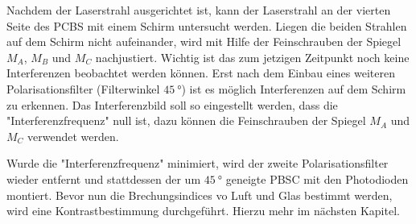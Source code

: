 Nachdem der Laserstrahl ausgerichtet ist, kann der Laserstrahl an der vierten Seite des PCBS
mit einem Schirm untersucht werden.
Liegen die beiden Strahlen auf dem Schirm nicht aufeinander, wird mit Hilfe der
Feinschrauben der Spiegel $M_A$, $M_B$ und $M_C$ nachjustiert. Wichtig ist das zum
jetzigen Zeitpunkt noch keine Interferenzen beobachtet werden können. Erst nach
dem Einbau eines weiteren Polarisationsfilter (Filterwinkel $\SI{45}{\degree}$)
ist es möglich Interferenzen auf dem Schirm zu erkennen.
Das Interferenzbild soll so eingestellt werden, dass die
"Interferenzfrequenz" null ist, dazu können die Feinschrauben der Spiegel
$M_A$ und $M_C$ verwendet werden.

Wurde die "Interferenzfrequenz" minimiert, wird der zweite Polarisationsfilter wieder
entfernt und stattdessen der um $\SI{45}{\degree}$ geneigte PBSC mit den Photodioden
montiert. Bevor nun die Brechungsindices vo Luft und Glas bestimmt werden, wird eine
Kontrastbestimmung durchgeführt. Hierzu mehr im nächsten Kapitel.

